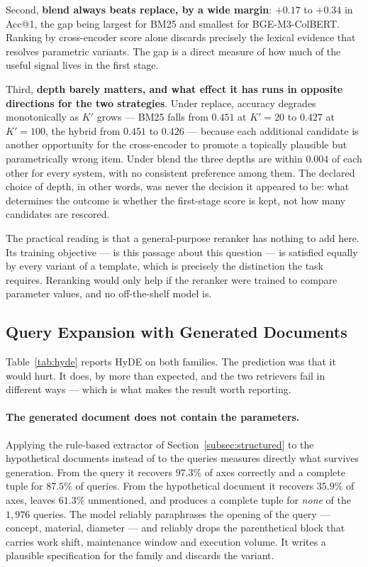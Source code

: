 \documentclass[preprint,review,12pt]{elsarticle}
\begin{document}
Second, \textbf{blend always beats replace, by a wide margin}: $+0.17$ to $+0.34$ in Acc@1, the gap being largest for BM25 and smallest for BGE-M3-ColBERT. Ranking by cross-encoder score alone discards precisely the lexical evidence that resolves parametric variants. The gap is a direct measure of how much of the useful signal lives in the first stage.

Third, \textbf{depth barely matters, and what effect it has runs in opposite directions for the two strategies}. Under replace, accuracy degrades monotonically as $K'$ grows --- BM25 falls from $0.451$ at $K'=20$ to $0.427$ at $K'=100$, the hybrid from $0.451$ to $0.426$ --- because each additional candidate is another opportunity for the cross-encoder to promote a topically plausible but parametrically wrong item. Under blend the three depths are within $0.004$ of each other for every system, with no consistent preference among them. The declared choice of depth, in other words, was never the decision it appeared to be: what determines the outcome is whether the first-stage score is kept, not how many candidates are rescored.

The practical reading is that a general-purpose reranker has nothing to add here. Its training objective --- is this passage about this question --- is satisfied equally by every variant of a template, which is precisely the distinction the task requires. Reranking would only help if the reranker were trained to compare parameter values, and no off-the-shelf model is.

\subsection{Query Expansion with Generated Documents}
\label{subsec:hyde_results}

Table~\ref{tab:hyde} reports HyDE on both families. The prediction was that it would hurt. It does, by more than expected, and the two retrievers fail in different ways --- which is what makes the result worth reporting.



\paragraph{The generated document does not contain the parameters.}
Applying the rule-based extractor of Section~\ref{subsec:structured} to the hypothetical documents instead of to the queries measures directly what survives generation. From the query it recovers $97.3\%$ of axes correctly and a complete tuple for $87.5\%$ of queries. From the hypothetical document it recovers $35.9\%$ of axes, leaves $61.3\%$ unmentioned, and produces a complete tuple for \emph{none} of the $1{,}976$ queries. The model reliably paraphrases the opening of the query --- concept, material, diameter --- and reliably drops the parenthetical block that carries work shift, maintenance window and execution volume. It writes a plausible specification for the family and discards the variant.
\end{document}
